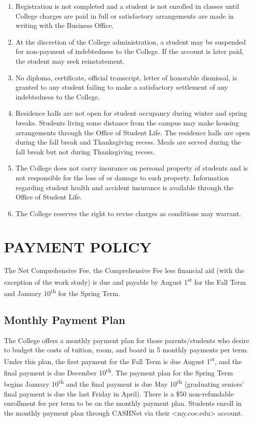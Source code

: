 \documentclass[
  letterpaper,
]{scrbook}
\providecommand{\tightlist}{%
  \setlength{\itemsep}{0pt}\setlength{\parskip}{0pt}}
\begin{document}
\begin{enumerate}
\def\labelenumi{\arabic{enumi}.}
\tightlist
\item
  Registration is not completed and a student is not enrolled in classes
  until College charges are paid in full or satisfactory arrangements
  are made in writing with the Business Office.
\item
  At the discretion of the College administration, a student may be
  suspended for non-payment of indebtedness to the College. If the
  account is later paid, the student may seek reinstatement.
\item
  No diploma, certificate, official transcript, letter of honorable
  dismissal, is granted to any student failing to make a satisfactory
  settlement of any indebtedness to the College.
\item
  Residence halls are not open for student occupancy during winter and
  spring breaks. Students living some distance from the campus may make
  housing arrangements through the Office of Student Life. The residence
  halls are open during the fall break and Thanksgiving recess. Meals
  are served during the fall break but not during Thanksgiving recess.
\item
  The College does not carry insurance on personal property of students
  and is not responsible for the loss of or damage to such property.
  Information regarding student health and accident insurance is
  available through the Office of Student Life.
\item
  The College reserves the right to revise charges as conditions may
  warrant.
\end{enumerate}

\hypertarget{payment-policy}{%
\section{PAYMENT POLICY}\label{payment-policy}}

The Net Comprehensive Fee, the Comprehensive Fee less financial aid
(with the exception of the work study) is due and payable by August
1\textsuperscript{st} for the Fall Term and January
10\textsuperscript{th} for the Spring Term.

\hypertarget{monthly-payment-plan}{%
\subsection{Monthly Payment Plan}\label{monthly-payment-plan}}

The College offers a monthly payment plan for those parents/students who
desire to budget the costs of tuition, room, and board in 5 monthly
payments per term. Under this plan, the first payment for the Fall Term
is due August 1\textsuperscript{st}, and the final payment is due
December 10\textsuperscript{th}. The payment plan for the Spring Term
begins January 10\textsuperscript{th} and the final payment is due May
10\textsuperscript{th} (graduating seniors' final payment is due the
last Friday in April). There is a \$50 non-refundable enrollment fee per
term to be on the monthly payment plan. Students enroll in the monthly
payment plan through CASHNet via their
\textless my.coe.edu\textgreater{} account.
\end{document}
